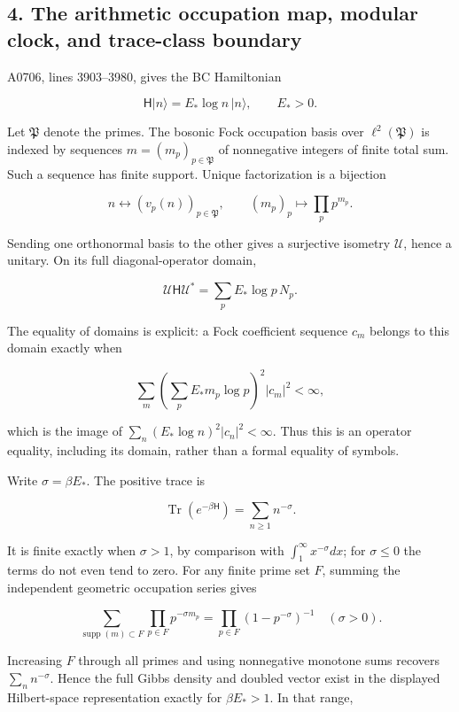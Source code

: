 \subsection{4. The arithmetic occupation map, modular clock, and
trace-class
boundary}\label{proof10:the-arithmetic-occupation-map-modular-clock-and-trace-class-boundary}

A0706, lines 3903--3980, gives the BC Hamiltonian

\[
\mathsf H|n\rangle=E_*\log n\,|n\rangle,
\qquad E_*>0.
\]

Let \(\mathfrak P\) denote the primes. The bosonic Fock occupation basis
over \(\ell^2(\mathfrak P)\) is indexed by sequences
\(m=(m_p)_{p\in\mathfrak P}\) of nonnegative integers of finite total
sum. Such a sequence has finite support. Unique factorization is a
bijection

\[
n\longleftrightarrow(v_p(n))_{p\in\mathfrak P},
\qquad (m_p)_p\longmapsto\prod_pp^{m_p}.
\]

Sending one orthonormal basis to the other gives a surjective isometry
\(\mathcal U\), hence a unitary. On its full diagonal-operator domain,

\[
\mathcal U\mathsf H\mathcal U^*=\sum_pE_*\log p\,N_p.
\]

The equality of domains is explicit: a Fock coefficient sequence \(c_m\)
belongs to this domain exactly when

\[
\sum_m\left(\sum_pE_*m_p\log p\right)^2|c_m|^2<\infty,
\]

which is the image of \(\sum_n(E_*\log n)^2|c_n|^2<\infty\). Thus this
is an operator equality, including its domain, rather than a formal
equality of symbols.

Write \(\sigma=\beta E_*\). The positive trace is

\[
\operatorname{Tr}(e^{-\beta\mathsf H})=\sum_{n\ge1}n^{-\sigma}.
\]

It is finite exactly when \(\sigma>1\), by comparison with
\(\int_1^\infty x^{-\sigma}dx\); for \(\sigma\le0\) the terms do not
even tend to zero. For any finite prime set \(F\), summing the
independent geometric occupation series gives

\[
\sum_{\operatorname{supp}(m)\subset F}\prod_{p\in F}p^{-\sigma m_p}
=\prod_{p\in F}(1-p^{-\sigma})^{-1}\quad(\sigma>0).
\]

Increasing \(F\) through all primes and using nonnegative monotone sums
recovers \(\sum_n n^{-\sigma}\). Hence the full Gibbs density and
doubled vector exist in the displayed Hilbert-space representation
exactly for \(\beta E_*>1\). In that range,

